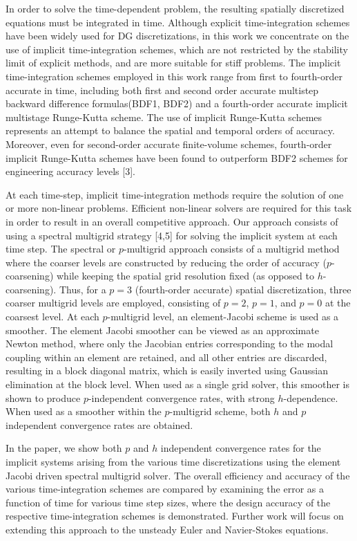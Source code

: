 \documentclass{report}
\begin{document}
In order to solve the time-dependent problem, the resulting spatially
discretized equations must be integrated in time. Although explicit
time-integration schemes have been widely used for DG discretizations,
in this work we concentrate on the use of implicit time-integration
schemes, which are not restricted by the stability limit of explicit
methods, and are more suitable for stiff problems. The implicit
time-integration schemes employed in this work range from first to
fourth-order accurate in time, including both first and second order
accurate multistep backward difference formulas(BDF1, BDF2) and a
fourth-order accurate implicit multistage Runge-Kutta scheme. The use
of implicit Runge-Kutta schemes represents an attempt to balance the
spatial and temporal orders of accuracy. Moreover, even for
second-order accurate finite-volume schemes, fourth-order implicit
Runge-Kutta schemes have been found to outperform BDF2 schemes for
engineering accuracy levels [3].

At each time-step, implicit time-integration methods require the
solution of one or more non-linear problems. Efficient non-linear
solvers are required for this task in order to result in an overall
competitive approach. Our approach consists of using a spectral
multigrid strategy [4,5] for solving the implicit system at each time
step. The spectral or $p$-multigrid approach consists of a multigrid
method where the coarser levels are constructed by reducing the order
of accuracy ($p$-coarsening) while keeping the spatial grid resolution
fixed (as opposed to $h$-coarsening). Thus, for a
$p=3$ (fourth-order
accurate) spatial discretization, three coarser multigrid levels are
employed, consisting of $p=2$, $p=1$, and $p=0$ at the coarsest level. At
each $p$-multigrid level, an element-Jacobi scheme is used as a smoother.
The element Jacobi smoother can be viewed as an approximate Newton
method, where only the Jacobian entries corresponding to the modal
coupling within an element are retained, and all other entries are
discarded, resulting in a block diagonal matrix, which is easily
inverted using Gaussian elimination at the block level. When used as a
single grid solver, this smoother is shown to produce $p$-independent
convergence rates, with strong $h$-dependence. When used as a smoother
within the $p$-multigrid scheme, both $h$ and $p$ independent convergence
rates are obtained.

In the paper, we show both $p$ and $h$ independent convergence rates for
the implicit systems arising from the various time discretizations
using the element Jacobi driven spectral multigrid solver. The overall
efficiency and accuracy of the various time-integration schemes are
compared by examining the error as a function of time for various time
step sizes, where the design accuracy of the respective
time-integration schemes is demonstrated. Further work will focus on
extending this approach to the unsteady Euler and Navier-Stokes
equations.
\end{document}
